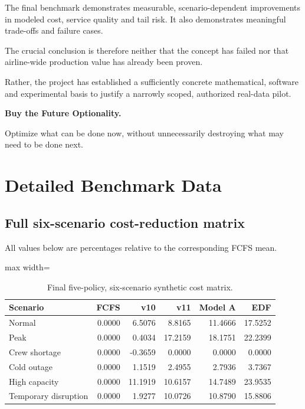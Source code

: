 \documentclass[10pt,a4paper]{article}
\theoremstyle{plain}
\theoremstyle{definition}
\theoremstyle{remark}
\begin{document}
The final benchmark demonstrates
measurable, scenario-dependent
improvements in modeled
cost, service quality and tail risk.
It also demonstrates meaningful
trade-offs and failure cases.

The crucial conclusion is therefore
neither that the concept has failed
nor that airline-wide production value
has already been proven.

Rather, the project has established
a sufficiently concrete mathematical,
software and experimental basis
to justify a narrowly scoped,
authorized real-data pilot.

\begin{center}

\vspace{5pt}

{\large\bfseries\color{Navy}
Buy the Future Optionality.
}

\vspace{3pt}

{\normalsize
Optimize what can be done now,
without unnecessarily destroying
what may need to be done next.
}

\end{center}

\appendix

\section{Detailed Benchmark Data}

\subsection{Full six-scenario cost-reduction matrix}

All values below are percentages relative
to the corresponding FCFS mean.

\begin{table}[!htbp]
\centering
\caption{
Final five-policy, six-scenario
synthetic cost matrix.
}
\small
\begin{adjustbox}{max width=\linewidth}
\begin{tabular}{@{}lrrrrr@{}}
\toprule
Scenario &
FCFS &
v10 &
v11 &
Model A &
EDF \\
\midrule
Normal & 0.0000 & 6.5076 & 8.8165 & 11.4666 & 17.5252\\
Peak & 0.0000 & 0.4034 & 17.2159 & 18.1751 & 22.2399\\
Crew shortage & 0.0000 & -0.3659 & 0.0000 & 0.0000 & 0.0000\\
Cold outage & 0.0000 & 1.1519 & 2.4955 & 2.7936 & 3.7367\\
High capacity & 0.0000 & 11.1919 & 10.6157 & 14.7489 & 23.9535\\
Temporary disruption & 0.0000 & 1.9277 & 10.0726 & 10.8790 & 15.8806\\
\bottomrule
\end{tabular}
\end{adjustbox}
\end{table}
\end{document}
